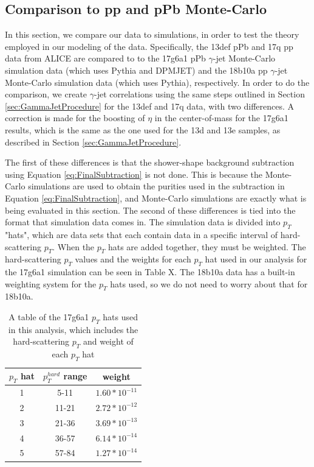 \subsection{Comparison to pp and pPb Monte-Carlo}
In this section, we compare our data to simulations, in order to test the theory employed in our modeling of the data. Specifically, the 13def pPb and 17q pp data from ALICE are compared to to the 17g6a1 pPb $\gamma$-jet Monte-Carlo simulation data (which uses Pythia and DPMJET) and the 18b10a pp $\gamma$-jet Monte-Carlo simulation data (which uses Pythia), respectively. In order to do the comparison, we create $\gamma$-jet correlations using the same steps outlined in Section \ref{sec:GammaJetProcedure} for the 13def and 17q data, with two differences. A correction is made for the boosting of $\eta$ in the center-of-mass for the 17g6a1 results, which is the same as the one used for the 13d and 13e samples, as described in Section \ref{sec:GammaJetProcedure}.

The first of these differences is that the shower-shape background subtraction using Equation \ref{eq:FinalSubtraction} is not done. This is because the Monte-Carlo simulations are used to obtain the purities used in the subtraction in Equation \ref{eq:FinalSubtraction}, and Monte-Carlo simulations are exactly what is being evaluated in this section. The second of these differences is tied into the format that simulation data comes in. The simulation data is divided into $p_T$ "hats", which are data sets that each contain data in a specific interval of hard-scattering $p_T$. When the $p_T$ hats are added together, they must be weighted. The hard-scattering $p_T$ values and the weights for each $p_T$ hat used in our analysis for the 17g6a1 simulation can be seen in Table X. The 18b10a data has a built-in weighting system for the $p_T$ hats used, so we do not need to worry about that for 18b10a.

\begin{table}
    \centering
    \begin{tabular}{c|c c}
        $p_T$ hat & $p_T^{hard}$ range & weight \\
        \hline
        1 & 5-11 & $1.60*10^{-11}$ \\
        2 & 11-21 & $2.72*10^{-12}$ \\
        3 & 21-36 & $3.69*10^{-13}$ \\
        4 & 36-57 & $6.14*10^{-14}$ \\
        5 & 57-84 & $1.27*10^{-14}$
    \end{tabular}
    \caption{A table of the 17g6a1 $p_T$ hats used in this analysis, which includes the hard-scattering $p_T$ and weight of each $p_T$ hat}
    \label{tab:pthats}
\end{table}

